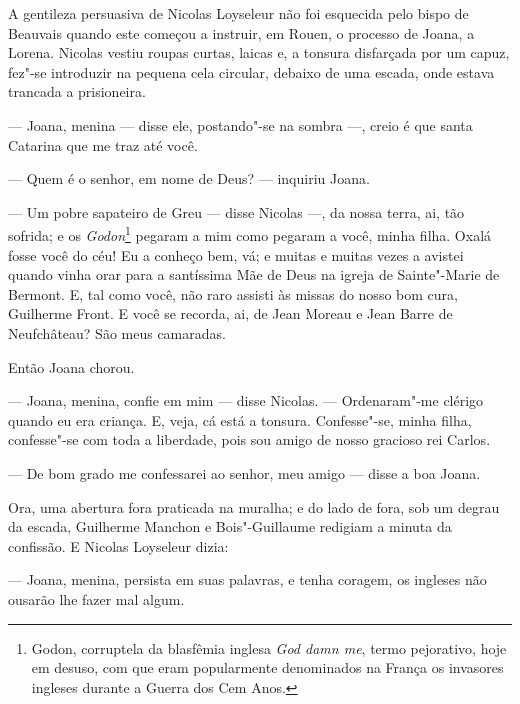 A gentileza persuasiva de Nicolas Loyseleur não foi esquecida pelo bispo de
Beauvais quando este começou a instruir, em Rouen, o processo de Joana, a
Lorena. Nicolas vestiu roupas curtas, laicas e, a tonsura disfarçada por
um capuz, fez"-se introduzir na pequena cela circular, debaixo de uma
escada, onde estava trancada a prisioneira.

--- Joana, menina --- disse ele, postando"-se na sombra ---, creio é que santa
Catarina que me traz até você.

--- Quem é o senhor, em nome de Deus? --- inquiriu Joana.

--- Um pobre sapateiro de Greu --- disse Nicolas ---, da nossa terra, ai, tão
sofrida; e os \textit{Godon}\footnote{ Godon, corruptela da blasfêmia
inglesa \textit{God damn me}, termo pejorativo, hoje em desuso, com que
eram popularmente denominados na França os invasores ingleses durante a
Guerra dos Cem Anos.} pegaram a mim como pegaram a você, minha
filha. Oxalá fosse você do céu! Eu a conheço bem, vá; e muitas e muitas
vezes a avistei quando vinha orar para a santíssima Mãe de Deus na igreja
de Sainte"-Marie de Bermont. E, tal como você, não raro assisti às missas
do nosso bom cura, Guilherme Front. E você se recorda, ai, de Jean Moreau
e Jean Barre de Neufchâteau? São meus camaradas.

Então Joana chorou.

--- Joana, menina, confie em mim --- disse Nicolas. --- Ordenaram"-me clérigo quando
eu era criança. E, veja, cá está a tonsura. Confesse"-se, minha filha,
confesse"-se com toda a liberdade, pois sou amigo de nosso gracioso rei
Carlos.

--- De bom grado me confessarei ao senhor, meu amigo --- disse a boa Joana.

Ora, uma abertura fora praticada na muralha; e do lado de fora, sob um
degrau da escada, Guilherme Manchon e Bois"-Guillaume redigiam a minuta da
confissão. E Nicolas Loyseleur dizia:

--- Joana, menina, persista em suas palavras, e tenha coragem, os ingleses
não ousarão lhe fazer mal algum.


